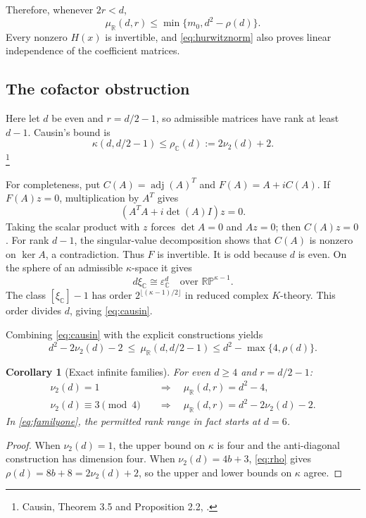 \documentclass[11pt]{article}
\newtheorem{corollary}[theorem]{Corollary}
\theoremstyle{definition}
\newcommand{\R}{\mathbb R}
\newcommand{\C}{\mathbb C}
\newcommand{\eps}{\varepsilon}
\newcommand{\muR}{\mu_{\R}}
\newcommand{\val}{\nu_2}
\newcommand{\pr}{\mathbb{RP}}
\begin{document}
Therefore, whenever $2r<d$,
\begin{equation}\label{eq:rhoUpper}
 \muR(d,r)\leq\min\{m_0,d^2-\rho(d)\}.
\end{equation}
Every nonzero $H(x)$ is invertible, and \eqref{eq:hurwitznorm} also proves linear independence of the coefficient matrices.

\subsection{The cofactor obstruction}
Here let $d$ be even and $r=d/2-1$, so admissible matrices have rank at least $d-1$. Causin's bound is
\begin{equation}\label{eq:causin}
 \kappa(d,d/2-1)\leq\rho_{\C}(d):=2\val(d)+2.
\end{equation}
\footnote{Causin, Theorem 3.5 and Proposition 2.2, \cite{causin}.}

For completeness, put $C(A)=\operatorname{adj}(A)^T$ and $F(A)=A+iC(A)$. If $F(A)z=0$, multiplication by $A^T$ gives
\[
 (A^TA+i\det(A)I)z=0.
\]
Taking the scalar product with $z$ forces $\det A=0$ and $Az=0$; then $C(A)z=0$. For rank $d-1$, the singular-value decomposition shows that $C(A)$ is nonzero on $\ker A$, a contradiction. Thus $F$ is invertible. It is odd because $d$ is even. On the sphere of an admissible $\kappa$-space it gives
\[
 d\xi_{\C}\cong\eps^d_{\C}\quad\text{over }\pr^{\kappa-1}.
\]
The class $[\xi_{\C}]-1$ has order $2^{\lfloor(\kappa-1)/2\rfloor}$ in reduced complex $K$-theory. This order divides $d$, giving \eqref{eq:causin}.

Combining \eqref{eq:causin} with the explicit constructions yields
\begin{equation}\label{eq:corankbounds}
 d^2-2\val(d)-2\ \leq\ \muR(d,d/2-1)
 \leq d^2-\max\{4,\rho(d)\}.
\end{equation}

\begin{corollary}[Exact infinite families]\label{cor:families}
For even $d\geq4$ and $r=d/2-1$:
\begin{align}
 \val(d)=1&\quad\Longrightarrow\quad \muR(d,r)=d^2-4,\label{eq:familyone}\\
 \val(d)\equiv3\pmod4&\quad\Longrightarrow\quad
 \muR(d,r)=d^2-2\val(d)-2.\label{eq:familythree}
\end{align}
In \eqref{eq:familyone}, the permitted rank range in fact starts at $d=6$.
\end{corollary}
\begin{proof}
When $\val(d)=1$, the upper bound on $\kappa$ is four and the anti-diagonal construction has dimension four. When $\val(d)=4b+3$, \eqref{eq:rho} gives $\rho(d)=8b+8=2\val(d)+2$, so the upper and lower bounds on $\kappa$ agree.
\end{proof}
\end{document}
